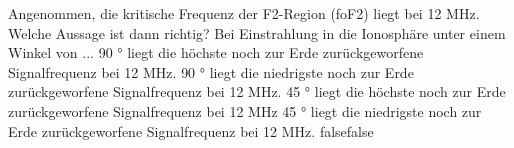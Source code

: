     {Angenommen, die kritische Frequenz der F2-Region (foF2) liegt bei 12 MHz. Welche Aussage ist dann richtig? Bei Einstrahlung in die Ionosphäre unter einem Winkel von ...}
    {90 ° liegt die höchste noch zur Erde zurückgeworfene Signalfrequenz bei 12 MHz.}
    {90 ° liegt die niedrigste noch zur Erde zurückgeworfene Signalfrequenz bei 12 MHz.}
    {45 ° liegt die höchste noch zur Erde zurückgeworfene Signalfrequenz bei 12 MHz}
    {45 ° liegt die niedrigste noch zur Erde zurückgeworfene Signalfrequenz bei 12 MHz.}
    {false}{false}